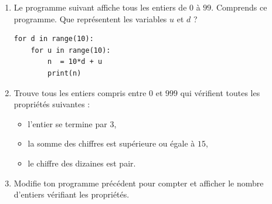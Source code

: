 \documentclass[11pt,class=report,crop=false]{standalone}
\begin{document}
\begin{activite}


\begin{enumerate}
  \item Le programme suivant affiche tous les entiers de $0$ à $99$. Comprends ce programme. Que représentent les variables $u$ et $d$ ?
  
\begin{center}
\begin{minipage}{0.5\textwidth}
\begin{lstlisting}
for d in range(10):
    for u in range(10):
        n  = 10*d + u
        print(n)
\end{lstlisting}
\end{minipage} 
\end{center} 
  
  \item Trouve tous les entiers compris entre $0$ et $999$ qui vérifient toutes les propriétés suivantes :
  \begin{itemize}
    \item l'entier se termine par $3$,
    
    \item la somme des chiffres est supérieure ou égale à $15$,
    
    \item le chiffre des dizaines est pair.
  \end{itemize}
   
  
  \item Modifie ton programme précédent pour compter et afficher le nombre d'entiers vérifiant les propriétés.
  
\end{enumerate}

\end{activite}
\end{document}
